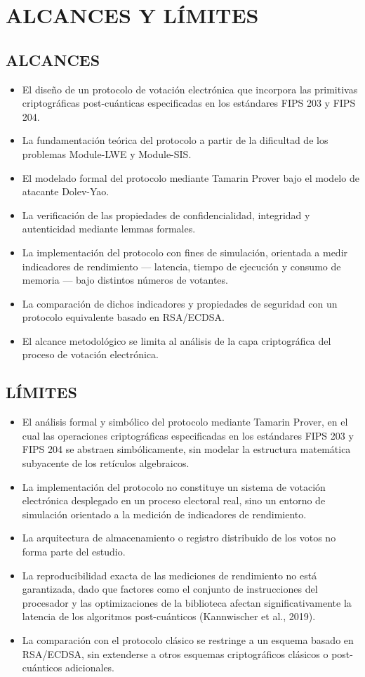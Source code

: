 \section{ALCANCES Y LÍMITES}

\subsection{ALCANCES}
\begin{itemize}
	\item El diseño de un protocolo de votación electrónica que incorpora las primitivas criptográficas post-cuánticas especificadas en los estándares FIPS 203 y FIPS 204.
	\item La fundamentación teórica del protocolo a partir de la dificultad de los problemas Module-LWE y Module-SIS.
	\item El modelado formal del protocolo mediante Tamarin Prover bajo el modelo de atacante Dolev-Yao.
	\item La verificación de las propiedades de confidencialidad, integridad y autenticidad mediante lemmas formales.
	\item La implementación del protocolo con fines de simulación, orientada a medir indicadores de rendimiento --- latencia, tiempo de ejecución y consumo de memoria --- bajo distintos números de votantes.
	\item La comparación de dichos indicadores y propiedades de seguridad con un protocolo equivalente basado en RSA/ECDSA.
	\item El alcance metodológico se limita al análisis de la capa criptográfica del proceso de votación electrónica.
\end{itemize}

\subsection{LÍMITES}
\begin{itemize}
	\item El análisis formal y simbólico del protocolo mediante Tamarin Prover, en el cual las operaciones criptográficas especificadas en los estándares FIPS 203 y FIPS 204 se abstraen simbólicamente, sin modelar la estructura matemática subyacente de los retículos algebraicos.
	\item La implementación del protocolo no constituye un sistema de votación electrónica desplegado en un proceso electoral real, sino un entorno de simulación orientado a la medición de indicadores de rendimiento.
	\item La arquitectura de almacenamiento o registro distribuido de los votos no forma parte del estudio.
	\item La reproducibilidad exacta de las mediciones de rendimiento no está garantizada, dado que factores como el conjunto de instrucciones del procesador y las optimizaciones de la biblioteca afectan significativamente la latencia de los algoritmos post-cuánticos (Kannwischer et al., 2019).
	\item La comparación con el protocolo clásico se restringe a un esquema basado en RSA/ECDSA, sin extenderse a otros esquemas criptográficos clásicos o post-cuánticos adicionales.
\end{itemize}


